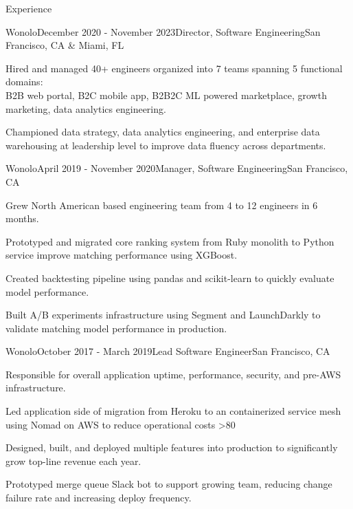 \documentclass[
	11pt, %
]{resume} %
\begin{document}
\begin{rSection}{Experience}

    \begin{rSubsection}{Wonolo}{December 2020 - November 2023}{Director, Software Engineering}{San Francisco, CA \& Miami, FL}
		\item Hired and managed 40+ engineers organized into 7 teams spanning 5 functional domains: \\
		B2B web portal, B2C mobile app, B2B2C ML powered marketplace, growth marketing, data analytics engineering.
        \item Championed data strategy, data analytics engineering, and enterprise data warehousing at leadership level to improve data fluency across departments.
	\end{rSubsection}


    \begin{rSubsection}{Wonolo}{April 2019 - November 2020}{Manager, Software Engineering}{San Francisco, CA}
		\item Grew North American based engineering team from 4 to 12 engineers in 6 months.
		\item Prototyped and migrated core ranking system from Ruby monolith to Python service improve matching performance using XGBoost.
		\item Created backtesting pipeline using pandas and scikit-learn to quickly evaluate model performance.
		\item Built A/B experiments infrastructure using Segment and LaunchDarkly to validate matching model performance in production.
	\end{rSubsection}


    \begin{rSubsection}{Wonolo}{October 2017 - March 2019}{Lead Software Engineer}{San Francisco, CA}
		\item Responsible for overall application uptime, performance, security, and pre-AWS infrastructure.
		\item Led application side of migration from Heroku to an containerized service mesh using Nomad on AWS to reduce operational costs >80%
		\item Designed, built, and deployed multiple features into production to significantly grow top-line revenue each year.
        \item Prototyped merge queue Slack bot to support growing team, reducing change failure rate and increasing deploy frequency.
	\end{rSubsection}


\end{rSection}
\end{document}
